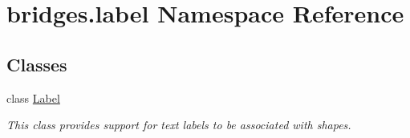 \hypertarget{namespacebridges_1_1label}{}\section{bridges.\+label Namespace Reference}
\label{namespacebridges_1_1label}
\subsection*{Classes}
\begin{DoxyCompactItemize}
\item 
class \hyperlink{classbridges_1_1label_1_1_label}{Label}
\begin{DoxyCompactList}\small\item\em This class provides support for text labels to be associated with shapes. \end{DoxyCompactList}\end{DoxyCompactItemize}
